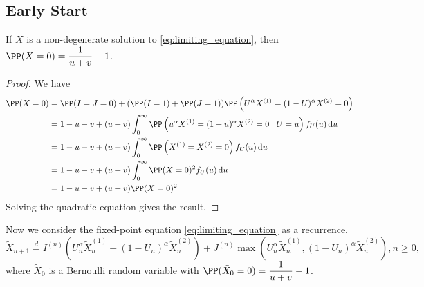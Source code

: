 \subsection{Early Start}

\begin{proposition}
  If $X$ is a non-degenerate solution to \eqref{eq:limiting_equation}, then $\PP(X=0) = \dfrac{1}{u+v}-1$.
\end{proposition}
\begin{proof}
  We have
  \begin{align*}
    \PP(X=0)
     & = \PP(I=J=0) + (\PP(I=1)+\PP(J=1))\PP\left(U^\alpha X^{(1)} = (1-U)^\alpha X^{(2)} = 0\right)                        \\
     & = 1-u-v + (u+v)\int_0^\infty \PP\left(u^\alpha X^{(1)} = (1-u)^\alpha X^{(2)} = 0 \mid U=u\right)f_U(u)\,\mathrm{d}u \\
     & = 1-u-v + (u+v)\int_0^\infty \PP\left(X^{(1)} = X^{(2)} = 0\right)f_U(u)\,\mathrm{d}u                                \\
     & = 1-u-v + (u+v)\int_0^\infty \PP(X=0)^2 f_U(u)\,\mathrm{d}u                                                          \\
     & = 1-u-v + (u+v)\PP(X=0)^2                                                                                            \\
  \end{align*}
  Solving the quadratic equation gives the result.
\end{proof}

Now we consider the fixed-point equation \eqref{eq:limiting_equation} as a recurrence.
\begin{equation}
  \tilde{X}_{n+1} \stackrel{d}{=} I^{(n)}\left(U_n^\alpha \tilde{X}_{n}^{(1)} + (1-U_n)^\alpha \tilde{X}_{n}^{(2)}\right) + J^{(n)}\max\left(U_n^\alpha \tilde{X}_{n}^{(1)}, (1-U_n)^\alpha \tilde{X}_{n}^{(2)}\right), n\ge 0,
\end{equation}
where $\tilde{X}_0$ is a Bernoulli random variable with $\PP(\tilde{X}_0=0) = \dfrac{1}{u+v}-1$.

